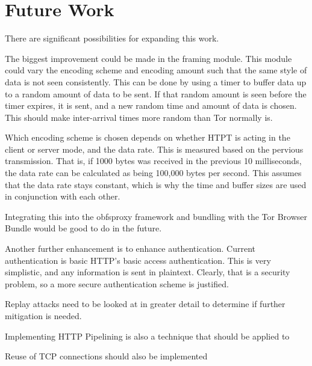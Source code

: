 \section{Future Work}

There are significant possibilities for expanding this work. 

The biggest improvement could be made in the framing module.  This module could vary the encoding scheme and encoding amount such that the same style of data is not seen consistently. This can be done by using a timer to buffer data up to a random amount of data to be sent. If that random amount is seen before the timer expires, it is sent, and a new random time and amount of data is chosen. This should make inter-arrival times more random than Tor normally is. 

Which encoding scheme is chosen depends on whether HTPT is acting in the client or server mode, and the data rate. This is measured based on the pervious transmission. That is, if 1000 bytes was received in the previous 10 milliseconds, the data rate can be calculated as being 100,000 bytes per second. This assumes that the data rate stays constant, which is why the time and buffer sizes are used in conjunction with each other.

Integrating this into the obfsproxy framework and bundling with the Tor Browser Bundle would be good to do in the future.

Another further enhancement is to enhance authentication. Current authentication is basic HTTP's basic access authentication. This is very simplistic, and any information is sent in plaintext. Clearly, that is a security problem, so a more secure authentication scheme is justified.

Replay attacks need to be looked at in greater detail to determine if further mitigation is needed.

Implementing HTTP Pipelining is also a technique that should be applied to 

Reuse of TCP connections should also be implemented

